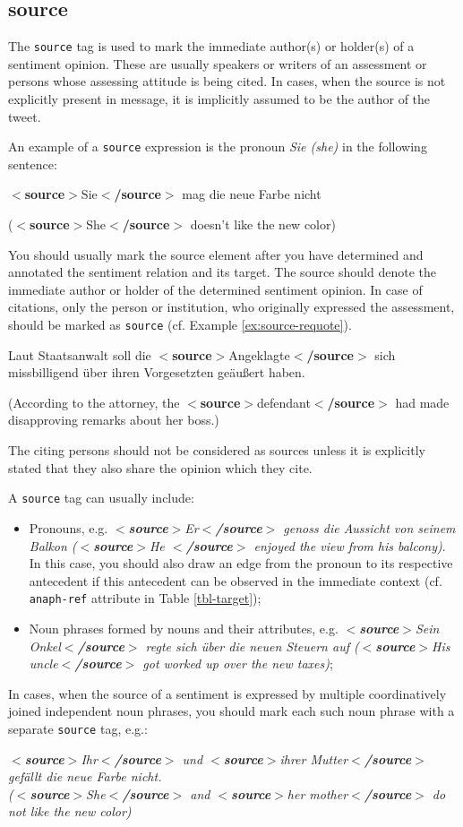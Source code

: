 \documentclass[11pt,a4paper]{article}
\newcommand{\xmltag}[1]{{\textbf{\small$<$#1$>$}}}
\newcommand{\source}[1]{\xmltag{source}#1\xmltag{/source}}
\newenvironment{myexe}{
  \begin{exe}
    \ex\begin{center}
    \itshape
}{
    \end{center}
  \end{exe}
}
\begin{document}
\subsection{source}
The \texttt{source} tag is used to mark the immediate author(s) or
holder(s) of a sentiment opinion.  These are usually speakers or
writers of an assessment or persons whose assessing attitude is being
cited.  In cases, when the source is not explicitly present in
message, it is implicitly assumed to be the author of the tweet.

An example of a \texttt{source} expression is the pronoun \textit{Sie
  (she)} in the following sentence:
\begin{myexe}
  \source{Sie} mag die neue Farbe nicht

  (\source{She} doesn't like the new color)
\end{myexe}

You should usually mark the source element after you have determined and
annotated the sentiment relation and its target.  The source should denote the
immediate author or holder of the determined sentiment opinion.  In case of
citations, only the person or institution, who originally expressed the
assessment, should be marked as \texttt{source} (cf. Example
\ref{ex:source-requote}).
\begin{myexe}
  Laut Staatsanwalt soll die \source{Angeklagte} sich missbilligend \"uber
  ihren Vorgesetzten ge\"au\ss{}ert haben.

  (According to the attorney, the \source{defendant} had made disapproving
  remarks about her boss.)\label{ex:source-requote}
\end{myexe}
The citing persons should not be considered as sources unless it is explicitly
stated that they also share the opinion which they cite.

A \texttt{source} tag can usually include:
\begin{itemize}
  \item Pronouns, e.g. \textit{\source{Er} genoss die Aussicht von seinem
    Balkon (\source{He } enjoyed the view from his balcony)}.  In this case,
    you should also draw an edge from the pronoun to its respective antecedent
    if this antecedent can be observed in the immediate context (cf.
    \texttt{anaph-ref} attribute in Table \ref{tbl-target});

  \item Noun phrases formed by nouns and their attributes,
    e.g. \textit{\source{Sein Onkel} regte sich \"uber die neuen Steuern auf
      (\source{His uncle} got worked up over the new taxes)};
\end{itemize}
In cases, when the source of a sentiment is expressed by multiple
coordinatively joined independent noun phrases, you should mark each such noun
phrase with a separate \texttt{source} tag, e.g.:
\begin{myexe}\label{ex:2source}
  \source{Ihr} und \source{ihrer Mutter} gef\"allt die neue Farbe
  nicht.\\ (\source{She} and \source{her mother} do not like the new
  color)
\end{myexe}
\end{document}
